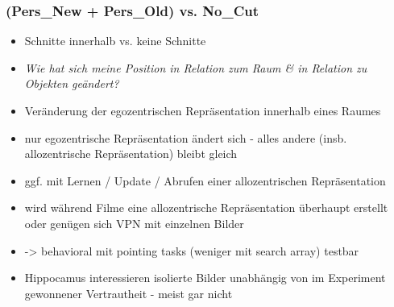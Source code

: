 \documentclass[10pt,a4paper,twocolumn]{article}
\begin{document}
\subsubsection{(Pers\_New + Pers\_Old) vs. No\_Cut }
\begin{itemize}
	\item Schnitte innerhalb vs. keine Schnitte
	\item \emph{Wie hat sich meine Position in Relation zum Raum \& in Relation
		zu Objekten geändert? }
	\item Veränderung der egozentrischen Repräsentation innerhalb eines Raumes 
	\item nur egozentrische Repräsentation ändert sich - alles andere (insb.
	allozentrische Repräsentation) bleibt gleich 
	\item ggf. mit Lernen / Update / Abrufen einer allozentrischen Repräsentation 
	\item wird während Filme eine allozentrische Repräsentation überhaupt erstellt
	oder genügen sich VPN mit einzelnen Bilder \citep{levin_2010_spatial_representations_familiar_TV} 
	\item -> behavioral mit pointing tasks (weniger mit search array) testbar
	\item Hippocamus interessieren isolierte Bilder \textendash{} unabhängig
	von im Experiment gewonnener Vertrautheit - meist gar nicht
\end{itemize}
\end{document}

